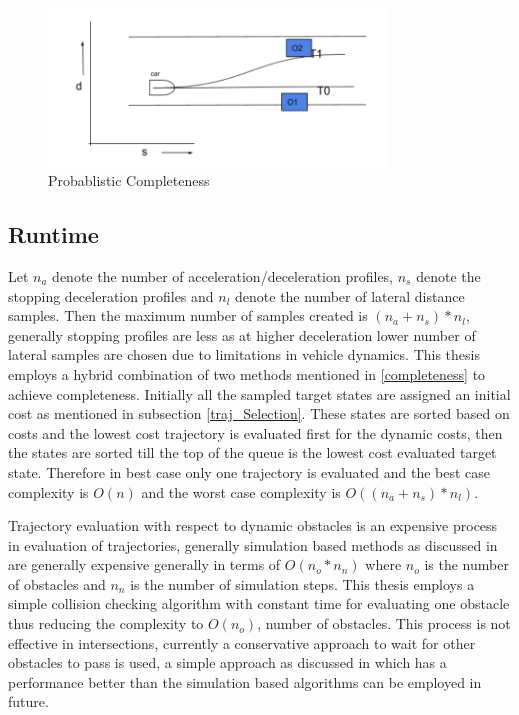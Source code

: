  \begin{figure}[H]
    \centering
    \includegraphics[width=0.8\textwidth]{Images/probablistically_complete.png}
    \caption{Probablistic Completeness}
    \label{probablistically_complete}
\end{figure}

\subsection{Runtime}

Let $n_a$ denote the number of acceleration/deceleration profiles, $n_s$ denote the stopping deceleration profiles and $n_l$ denote the number of lateral distance samples. Then the maximum number of samples created is $(n_a+n_s)*n_l$, generally stopping profiles are less as at higher deceleration lower number of lateral samples are chosen due to limitations in vehicle dynamics. This thesis employs a hybrid combination of two methods mentioned in \ref{completeness} to achieve completeness. Initially all the sampled target states are assigned an initial cost as mentioned in subsection \ref{traj_Selection}. These states are sorted based on costs and the lowest cost trajectory is evaluated first for the dynamic costs, then the states are sorted till the top of the queue is the lowest cost evaluated target state. Therefore in best case only one trajectory is evaluated and the best case complexity is $O(n)$ and the worst case complexity is $O((n_a+n_s)*n_l)$.

Trajectory evaluation with respect to dynamic obstacles is an expensive process in evaluation of trajectories, generally simulation based methods as discussed in  \cite{kolski_thesis} are generally expensive generally in terms of $O(n_o*n_n)$ where $n_o$ is the number of obstacles and $n_n$ is the number of simulation steps. This thesis employs a simple collision checking algorithm with constant time for evaluating one obstacle thus reducing the complexity to $O(n_o)$, number of obstacles. This process is not effective in intersections, currently a conservative approach to wait for other obstacles to pass is used, a simple approach as discussed in \cite{rrt_star} which has a performance better than the simulation based algorithms can be employed in future.  

